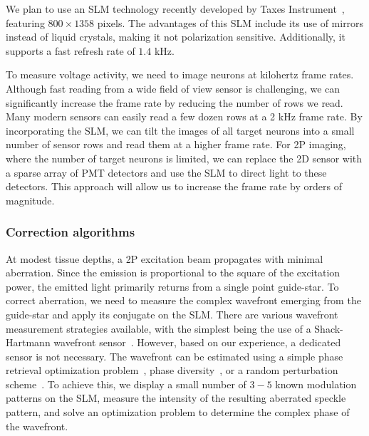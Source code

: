 
We plan to use an SLM technology recently developed by Taxes Instrument~\cite{PLM-TI_2019}, featuring $800 \times 1358$ pixels. The advantages of this SLM include its use of mirrors instead of liquid crystals, making it not polarization sensitive. Additionally, it supports a fast refresh rate of $1.4$ kHz.




To measure voltage activity, we need to image neurons at kilohertz frame rates. Although fast reading from a wide field of view sensor is challenging, we can significantly increase the frame rate by reducing the number of rows we read. Many modern sensors can easily read a few dozen rows at a 2 kHz frame rate. By incorporating the SLM, we can tilt the images of all target neurons into a small number of sensor rows and read them at a higher frame rate.
For 2P imaging, where the number of target neurons is limited, we can replace the 2D sensor with a sparse array of PMT detectors and use the SLM to direct light to these detectors. This approach will allow us to increase the frame rate by orders of magnitude.




\subsubsection{Correction algorithms}
 At modest tissue depths, a 2P excitation beam propagates with minimal aberration. Since the emission is proportional to the square of the excitation power, the emitted light primarily returns from a single point guide-star. To correct aberration, we need to measure the complex wavefront emerging from the guide-star and apply its conjugate on the SLM.
There are various wavefront measurement strategies available, with the simplest being the use of a Shack-Hartmann wavefront sensor~\cite{Platt2001HistoryAP,Aviles-Espinosa:11,Cha2010SHwavefrontsensor}. However, based on our experience, a dedicated sensor is not necessary. The wavefront can be estimated using a simple phase retrieval optimization problem~\cite{candes2015}, phase diversity~\cite{Dean2003,Robert1982}, or a random perturbation scheme~\cite{WISH2019}.
To achieve this, we display a small number of $3-5$ known modulation patterns on the SLM, measure the intensity of the resulting aberrated speckle pattern, and solve an optimization problem to determine the complex phase of the wavefront.

